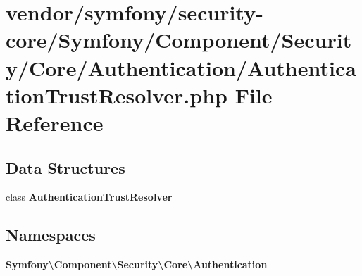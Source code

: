 \section{vendor/symfony/security-\/core/\+Symfony/\+Component/\+Security/\+Core/\+Authentication/\+Authentication\+Trust\+Resolver.php File Reference}
\label{_authentication_trust_resolver_8php}
\subsection*{Data Structures}
\begin{DoxyCompactItemize}
\item 
class {\bf Authentication\+Trust\+Resolver}
\end{DoxyCompactItemize}
\subsection*{Namespaces}
\begin{DoxyCompactItemize}
\item 
 {\bf Symfony\textbackslash{}\+Component\textbackslash{}\+Security\textbackslash{}\+Core\textbackslash{}\+Authentication}
\end{DoxyCompactItemize}
